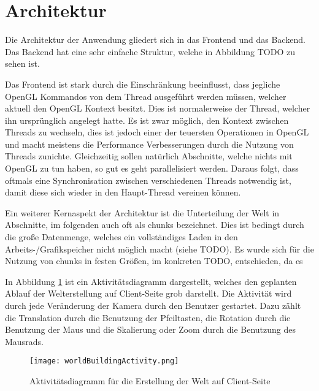 \section{Architektur}
Die Architektur der Anwendung gliedert sich in das Frontend und das Backend. Das Backend hat eine sehr einfache Struktur, welche in Abbildung TODO zu sehen ist.



Das Frontend ist stark durch die Einschränkung beeinflusst, dass jegliche OpenGL Kommandos von dem Thread ausgeführt werden müssen, welcher aktuell den OpenGL Kontext besitzt. Dies ist normalerweise der Thread, welcher ihn ursprünglich angelegt hatte. Es ist zwar möglich, den Kontext zwischen Threads zu wechseln, dies ist jedoch einer der teuersten Operationen in OpenGL und macht meistens die Performance Verbesserungen durch die Nutzung von Threads zunichte. Gleichzeitig sollen natürlich Abschnitte, welche nichts mit OpenGL zu tun haben, so gut es geht parallelisiert werden. Daraus folgt, dass oftmals eine Synchronisation zwischen verschiedenen Threads notwendig ist, damit diese sich wieder in den Haupt-Thread vereinen können.




Ein weiterer Kernaspekt der Architektur ist die Unterteilung der Welt in Abschnitte, im folgenden auch oft als chunks bezeichnet. Dies ist bedingt durch die große Datenmenge, welches ein vollständiges Laden in den Arbeits-/Grafikspeicher nicht möglich macht (siehe TODO). Es wurde sich für die Nutzung von chunks in festen Größen, im konkreten TODO, entschieden, da es 


In Abbildung \ref{worldBuildingActivity} ist ein Aktivitätsdiagramm dargestellt, welches den geplanten Ablauf der Welterstellung auf Client-Seite grob darstellt. Die Aktivität wird durch jede Veränderung der Kamera durch den Benutzer gestartet. Dazu zählt die Translation durch die Benutzung der Pfeiltasten, die Rotation durch die Benutzung der Maus und die Skalierung oder Zoom durch die Benutzung des Mausrads.

\begin{figure}[H]
  \texttt{[image: worldBuildingActivity.png]}
  \caption{Aktivitätsdiagramm für die Erstellung der Welt auf Client-Seite}
  \label{worldBuildingActivity}
\end{figure}

